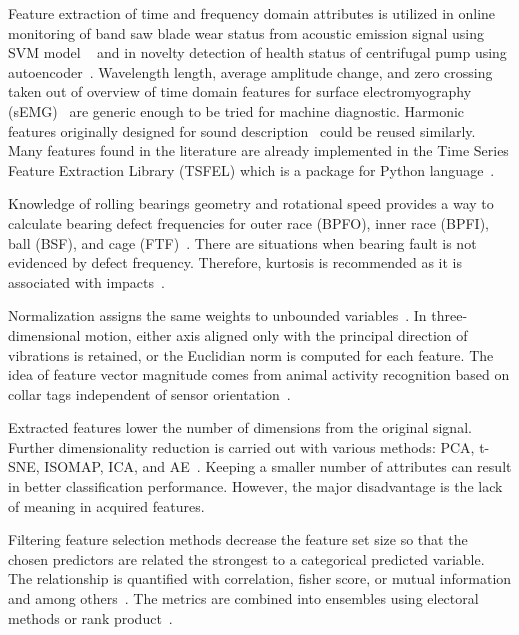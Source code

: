 \documentclass{llncs}
\begin{document}
Feature extraction of time and frequency domain attributes is utilized in online monitoring of band saw blade wear status from acoustic emission signal using SVM model ~\cite{zhuo_research_2022} and in novelty detection of health status of centrifugal pump using autoencoder~\cite{mostafavi_novel_2021}. Wavelength length, average amplitude change, and zero crossing taken out of overview of time domain features for surface electromyography (sEMG)~\cite{moctar_time-domain_2023} are generic enough to be tried for machine diagnostic. Harmonic features originally designed for sound description~\cite{peeters_large_2004} could be reused similarly. Many features found in the literature are already implemented in the Time Series Feature Extraction Library (TSFEL) which is a package for Python language~\cite{tsfel}. 

Knowledge of rolling bearings geometry and rotational speed provides a way to calculate bearing defect frequencies for outer race (BPFO), inner race (BPFI), ball (BSF), and cage (FTF)~\cite{mohanty_machinery_2015, ziaran_technicka_2013}. There are situations when bearing fault is not evidenced by defect frequency. Therefore, kurtosis is recommended as it is associated with impacts~\cite{brito_fault_2021}.

Normalization assigns the same weights to unbounded variables~\cite{zheng_feature_2018}. In three-dimensional motion, either axis aligned only with the principal direction of vibrations is retained, or the Euclidian norm is computed for each feature. The idea of feature vector magnitude comes from animal activity recognition based on collar tags independent of sensor orientation~\cite{kamminga_robust_2018}. 

Extracted features lower the number of dimensions from the original signal. Further dimensionality reduction is carried out with various methods: PCA, t-SNE, ISOMAP, ICA, and AE~\cite{brito_fault_2021}. Keeping a smaller number of attributes can result in better classification performance. However, the major disadvantage is the lack of meaning in acquired features. 

Filtering feature selection methods decrease the feature set size so that the chosen predictors are related the strongest to a categorical predicted variable.
The relationship is quantified with correlation, fisher score, or mutual information and among others~\cite{nandi_condition_2019}. The metrics are combined into ensembles using electoral methods or rank product~\cite{breitling_rank_2004}.
\end{document}
